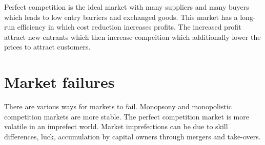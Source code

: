 \documentclass[
]{book}
\begin{document}
Perfect competition is the ideal market with many suppliers and many buyers which leads to low entry barriers and exchanged goods. This market has a long-run efficiency in which cost reduction increases profits. The increased profit attract new entrants which then increase compeition which additionally lower the prices to attract customers.

\hypertarget{market-failures}{%
\section{Market failures}\label{market-failures}}

There are various ways for markets to fail. Monopsony and monopolistic competition markets are more stable. The perfect competition market is more volatile in an imprefect world. Market imprefections can be due to skill differences, luck, accumulation by capital owners through mergers and take-overs.

  
\end{document}
